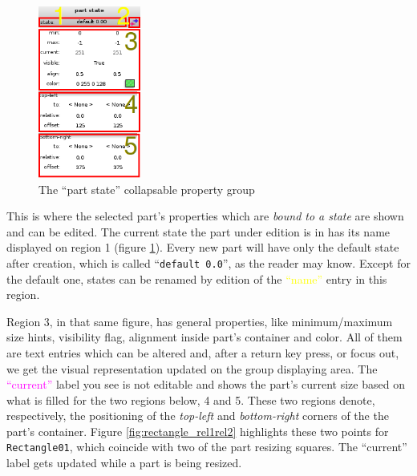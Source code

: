 \documentclass[a4paper]{profusion}
\newcommand{\GUILabel}[1]{\textcolor{magenta}{#1}}
\newcommand{\GUIEditable}[1]{\textcolor{yellow}{#1}} %
\begin{document}
\begin{figure}[h!]
  \centering
  \includegraphics[width=0.3\textwidth]{images/part_state_group.png}
  \caption{The ``part state'' collapsable property group}
  \label{fig:part_state_group}
\end{figure}

This is where the selected part's properties which are \emph{bound to
  a state} are shown and can be edited. The current state the part
under edition is in has its name displayed on region 1 (figure
\ref{fig:part_state_group}). Every new part will have only the default
state after creation, which is called ``\texttt{default 0.0}'', as the
reader may know. Except for the default one, states can be renamed by
edition of the \GUIEditable{``name''} entry in this region.

Region 3, in that same figure, has general properties, like
minimum/maximum size hints, visibility flag, alignment inside part's
container and color. All of them are text entries which can be altered
and, after a return key press, or focus out, we get the visual
representation updated on the group displaying area. The
\GUILabel{``current''} label you see is not editable and shows the
part's current size based on what is filled for the two regions below,
4 and 5. These two regions denote, respectively, the positioning of
the \emph{top-left} and \emph{bottom-right} corners of the the part's
container. Figure \ref{fig:rectangle_rel1rel2} highlights these two
points for \texttt{Rectangle01}, which coincide with two of the part
resizing squares. The ``current'' label gets updated while a part is
being resized.
\end{document}
